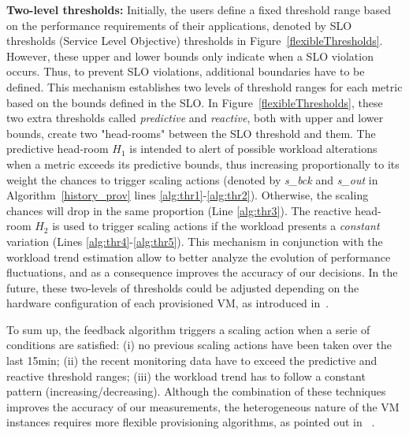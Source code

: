 \textbf{Two-level thresholds:} Initially, the users define a fixed
threshold range based on the performance requirements of their
applications, denoted by SLO thresholds (Service Level Objective)
thresholds in Figure~\ref{flexibleThresholds}. However, these upper
and lower bounds only indicate when a SLO violation occurs. Thus, to
prevent SLO violations, additional boundaries have to be defined. This
mechanism establishes two levels of threshold ranges for each metric
based on the bounds defined in the SLO. In
Figure~\ref{flexibleThresholds}, these two extra thresholds called
\emph{predictive} and \emph{reactive}, both with upper and lower
bounds, create two "head-rooms" between the SLO threshold and
them. The predictive head-room $H_1$ is intended to alert of possible
workload alterations when a metric exceeds its predictive bounds, thus
increasing proportionally to its weight the chances to trigger scaling
actions (denoted by \emph{s\_bck} and \emph{s\_out} in
Algorithm~\ref{history_prov} lines
\ref{alg:thr1}-\ref{alg:thr2}). Otherwise, the scaling chances will
drop in the same proportion (Line \ref{alg:thr3}). The reactive
head-room $H_2$ is used to trigger scaling actions if the workload
presents a \emph{constant} variation (Lines
\ref{alg:thr4}-\ref{alg:thr5}). This mechanism in conjunction with the
workload trend estimation allow to better analyze the evolution of
performance fluctuations, and as a consequence improves the accuracy
of our decisions. In the future, these two-levels of thresholds could
be adjusted depending on the hardware configuration of each
provisioned VM, as introduced in~\cite{beloglazov_adaptive_2010}.

To sum up, the feedback algorithm triggers a scaling action when a serie of conditions are satisfied: (i) no previous scaling actions have been taken over the last 15min; (ii) the recent monitoring data have to exceed the predictive and reactive threshold ranges; (iii) the workload trend has to follow a constant pattern (increasing/decreasing). Although the combination of these techniques improves the accuracy of our measurements, the heterogeneous nature of the VM instances requires more flexible provisioning algorithms, as pointed out in ~\cite{jiangThesis}. 


